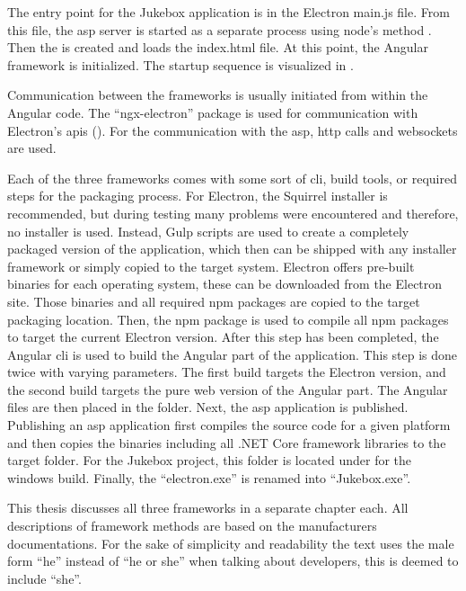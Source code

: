 
The entry point for the Jukebox application is in the Electron main.js file. From this file, the \gls{asp} server is started as a separate process using node's  method \cite{nodeSpawn}. Then the  is created and loads the index.html file. At this point, the Angular framework is initialized. The startup sequence is visualized in .


Communication between the frameworks is usually initiated from within the Angular code. The \enquote{ngx-electron} package is used for communication with Electron's \glspl{api}  (). For the communication with the \gls{asp}, \gls{http} calls and websockets are used.


Each of the three frameworks comes with some sort of \gls{cli}, build tools, or required steps for the packaging process. For Electron, the Squirrel \cite{squirrel} installer is recommended, but during testing many problems were encountered and therefore, no installer is used. Instead, Gulp scripts \cite{gulp} are used to create a completely packaged version of the application, which then can be shipped with any installer framework or simply copied to the target system. Electron offers pre-built binaries for each operating system, these can be downloaded from the Electron site. Those binaries and all required \gls{npm} packages are copied to the target packaging location. Then, the  \gls{npm} package is used to compile all \gls{npm} packages to target the current Electron version. After this step has been completed, the Angular \gls{cli} is used to build the Angular part of the application. This step is done twice with varying parameters. The first build targets the Electron version, and the second build targets the pure web version of the Angular part. The Angular files are then placed in the  folder. Next, the \gls{asp} application is published. Publishing an \gls{asp} application first compiles the source code for a given platform and then copies the binaries including all .NET Core framework libraries to the target folder. For the Jukebox project, this folder is located under  for the windows build. Finally, the \enquote{electron.exe} is renamed into \enquote{Jukebox.exe}.


This thesis discusses all three frameworks in a separate chapter each. All descriptions of framework methods are based on the manufacturers documentations. For the sake of simplicity and readability the text uses the male form \enquote{he} instead of \enquote{he or she} when talking about developers, this is deemed to include \enquote{she}.
